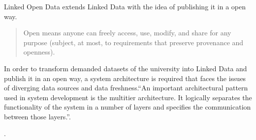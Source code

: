 Linked Open Data extends Linked Data with the idea of publishing it in a open way.
\begin{quote} Open means anyone can freely access, use, modify, and share for any purpose (subject, at most, to requirements that preserve provenance and openness).\cite{url:open_definition}\end{quote}

In order to transform demanded datasets of the university into Linked Data and publish it in an open way, a system architecture is required that faces the issues of diverging data sources and data freshness.\enquote{An important architectural pattern used in system development is the multitier architecture. It logically separates the functionality of the system in a number of layers and specifies the communication between those layers.}\cite{simperl_using_2013}.

. 

